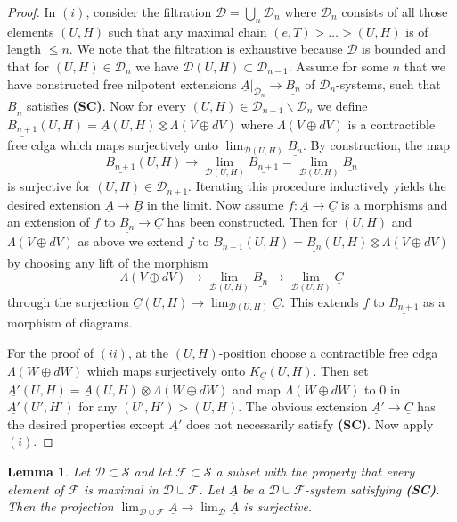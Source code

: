 \documentclass[12pt,a4paper]{article}
\newtheorem{lem}[thm]{Lemma}
\theoremstyle{definition}
\begin{document}
\begin{proof}
In $(i)$, consider the filtration $\mathcal{D}=\bigcup_n \mathcal{D}_n$ where $\mathcal{D}_n$ consists of all those elements $(U,H)$ such that any maximal chain $(e,T)>\ldots> (U,H)$ is of length $\leq n$. We note that the filtration is exhaustive because $\mathcal{D}$ is bounded and that for $(U,H)\in \mathcal{D}_n$ we have $\mathcal{D}(U,H)\subset \mathcal{D}_{n-1}$. Assume for some $n$ that we have constructed free nilpotent extensions $\underline{A}|_{\mathcal{D}_n}\rightarrow \underline{B_n}$ of $\mathcal{D}_n$-systems, such that $\underline{B}_n$ satisfies \textbf{(SC)}. Now for every $(U,H)\in \mathcal{D}_{n+1}\backslash \mathcal{D}_{n}$ we define $\underline{B_{n+1}}(U,H)=\underline{A}(U,H)\otimes\Lambda(V\oplus dV)$ where $\Lambda(V\oplus dV)$ is a contractible free cdga which maps surjectively onto $\lim_{\mathcal{D}(U,H)} \underline{B_n}$. By construction, the map
\[\underline{B_{n+1}}(U,H)\rightarrow \lim_{\mathcal{D}(U,H)} \underline{B_{n+1}}=\lim_{\mathcal{D}(U,H)} \underline{B_n}\]
is surjective for $(U,H)\in \mathcal{D}_{n+1}$.
Iterating this procedure inductively yields the desired extension $\underline{A}\rightarrow \underline{B}$ in the limit. Now assume $f\colon\underline{A}\rightarrow \underline{C}$ is a morphisms and an extension of $f$ to $\underline{B_n}\rightarrow \underline{C}$ has been constructed. Then for $(U,H)$ and $\Lambda(V\oplus dV)$ as above we extend $f$ to $\underline{B_{n+1}}(U,H)=\underline{B_n}(U,H)\otimes\Lambda(V\oplus dV)$ by choosing any lift of the morphism
\[\Lambda(V\oplus dV)\rightarrow \lim_{\mathcal{D}(U,H)} \underline{B_n}\rightarrow \lim_{\mathcal{D}(U,H)} \underline{C}\] through the surjection $\underline{C}(U,H)\rightarrow \lim_{\mathcal{D}(U,H)} \underline{C}$. This extends $f$ to $\underline{B_{n+1}}$ as a morphism of diagrams.

For the proof of $(ii)$, at the $(U,H)$-position choose a contractible free cdga $\Lambda(W\oplus dW)$ which maps surjectively onto $K_{\underline{C}}(U,H)$. Then set $\underline{A'}(U,H)=\underline{A}(U,H)\otimes \Lambda(W\oplus dW)$ and map $\Lambda(W\oplus dW)$ to $0$ in $\underline{A'}(U',H')$ for any $(U',H')>(U,H)$. The obvious extension $\underline{A}'\rightarrow \underline{C}$ has the desired properties except $\underline{A'}$ does not necessarily satisfy \textbf{(SC)}. Now apply $(i)$.
\end{proof}

\begin{lem}\label{lem:pullbacksurj}
Let $\mathcal{D}\subset \mathcal{S}$ and let $\mathcal{F}\subset \mathcal{S}$ a subset with the property that every element of $\mathcal{F}$ is maximal in $\mathcal{D}\cup \mathcal{F}$.
Let $\underline{A}$ be a $\mathcal{D}\cup\mathcal{F}$-system satisfying \textbf{(SC)}. Then the projection $\lim_{\mathcal{D}\cup\mathcal{F}}\underline{A}\rightarrow \lim_{\mathcal{D}}\underline{A}$ is surjective.
\end{lem}
\end{document}
